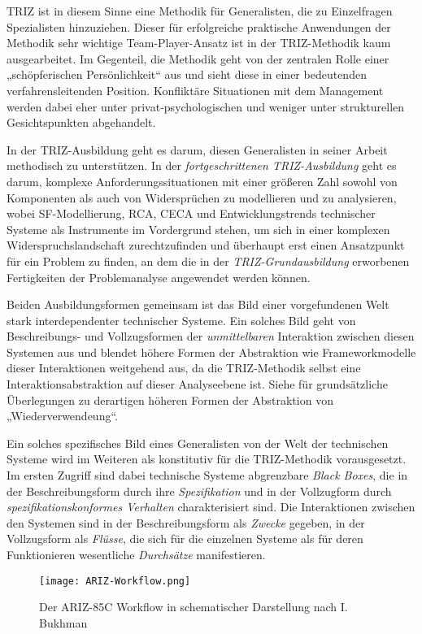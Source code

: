 \documentclass[11pt,a4paper]{article}
\begin{document}
TRIZ ist in diesem Sinne eine Methodik für Generalisten, die zu Einzelfragen
Spezialisten hinzuziehen. Dieser für erfolgreiche praktische Anwendungen der
Methodik sehr wichtige Team-Player-Ansatz ist in der TRIZ-Methodik kaum
ausgearbeitet.  Im Gegenteil, die Methodik geht von der zentralen Rolle einer
„schöpferischen Persönlichkeit“ aus und sieht diese in einer bedeutenden
verfahrensleitenden Position. Konfliktäre Situationen mit dem Management
werden dabei eher unter privat-psychologischen und weniger unter strukturellen
Gesichtspunkten abgehandelt.

In der TRIZ-Ausbildung geht es darum, diesen Generalisten in seiner Arbeit
methodisch zu unterstützen. In der \emph{fortgeschrittenen TRIZ-Ausbildung}
geht es darum, komplexe Anforderungssituationen mit einer größeren Zahl sowohl
von Komponenten als auch von Widersprüchen zu modellieren und zu analysieren,
wobei SF-Modellierung, RCA, CECA und Entwicklungstrends technischer Systeme
als Instrumente im Vordergrund stehen, um sich in einer komplexen
Widerspruchslandschaft zurechtzufinden und überhaupt erst einen Ansatzpunkt
für ein Problem zu finden, an dem die in der \emph{TRIZ-Grundausbildung}
erworbenen Fertigkeiten der Problemanalyse angewendet werden können.

Beiden Ausbildungsformen gemeinsam ist das Bild einer vorgefundenen Welt stark
interdependenter technischer Systeme. Ein solches Bild geht von Beschreibungs-
und Vollzugsformen der \emph{unmittelbaren} Interaktion zwischen diesen
Systemen aus und blendet höhere Formen der Abstraktion wie Frameworkmodelle
dieser Interaktionen weitgehend aus, da die TRIZ-Methodik selbst eine
Interaktionsabstraktion auf dieser Analyseebene ist.  Siehe
\cite{Szyperski2002} für grundsätzliche Überlegungen zu derartigen höheren
Formen der Abstraktion von „Wiederverwendeung“.

Ein solches spezifisches Bild eines Generalisten von der Welt der technischen
Systeme wird im Weiteren als konstitutiv für die TRIZ-Methodik vorausgesetzt.
Im ersten Zugriff sind dabei technische Systeme abgrenzbare \emph{Black
  Boxes}, die in der Beschreibungsform durch ihre \emph{Spezifikation} und in
der Vollzugform durch \emph{spezifikationskonformes Verhalten} charakterisiert
sind.  Die Interaktionen zwischen den Systemen sind in der Beschreibungsform
als \emph{Zwecke} gegeben, in der Vollzugsform als \emph{Flüsse}, die sich für
die einzelnen Systeme als für deren Funktionieren wesentliche
\emph{Durchsätze} manifestieren.

\begin{figure}
  \texttt{[image: ARIZ-Workflow.png]}
  \caption{Der ARIZ-85C Workflow in schematischer Darstellung nach I. Bukhman}
\end{figure}
\end{document}
